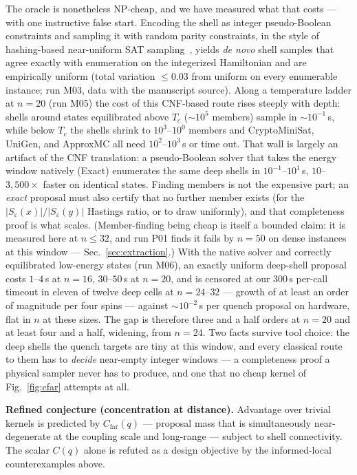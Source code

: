 \documentclass[aps,prx,reprint,floatfix,amsmath,amssymb,amsfonts]{revtex4-2}
\begin{document}
The oracle is nonetheless NP-cheap, and we have measured what that
costs --- with one instructive false start. Encoding the shell as
integer pseudo-Boolean constraints and sampling it with random parity
constraints, in the style of hashing-based near-uniform SAT
sampling~\cite{Gomes2006XOR,Ermon2012UAI,Chakraborty2014UniGen}, yields
\emph{de novo} shell samples that agree exactly with enumeration on the
integerized Hamiltonian and are empirically uniform (total variation
$\le 0.03$ from uniform on every enumerable instance; run M03, data
with the manuscript source). Along a temperature ladder at $n=20$ (run
M05) the cost of this CNF-based route rises steeply with depth: shells
around states equilibrated above $T_c$ ($\sim\!10^{5}$ members) sample
in $\sim 10^{-1}$\,s, while below $T_c$ the shells shrink to
$10^{3}$--$10^{0}$ members and CryptoMiniSat, UniGen, and ApproxMC all
need $10^{2}$--$10^{3}$\,s or time out. That wall is largely an artifact
of the CNF translation: a pseudo-Boolean solver that takes the energy
window natively (Exact) enumerates the same deep shells in
$10^{-1}$--$10^{1}$\,s, $10$--$3{,}500\times$ faster on identical
states. Finding members is not the expensive part; an \emph{exact} proposal
must also certify that no further member exists (for the
$|S_\varepsilon(x)|/|S_\varepsilon(y)|$ Hastings ratio, or to draw
uniformly), and that completeness proof is what scales. (Member-finding
being cheap is itself a bounded claim: it is measured here at
$n\le 32$, and run P01 finds it fails by $n=50$ on dense instances at
this window --- Sec.~\ref{sec:extraction}.) With the native
solver and correctly equilibrated low-energy states (run M06), an
exactly uniform deep-shell proposal costs $1$--$4$\,s at $n=16$,
$30$--$50$\,s at $n=20$, and is censored at our $300$\,s per-call
timeout in eleven of twelve deep cells at $n=24$--$32$ --- growth of at
least an order of magnitude per four spins --- against $\sim 10^{-2}$\,s
per quench proposal on hardware, flat in $n$ at these sizes. The gap is
therefore three and a half orders at $n=20$ and at least four and a
half, widening, from $n=24$. Two facts survive tool choice: the deep
shells the quench targets are tiny at this window, and every classical
route to them has to \emph{decide} near-empty integer windows --- a
completeness proof a physical sampler never has to produce, and one that
no cheap kernel of Fig.~\ref{fig:cfar} attempts at all.

\noindent\textbf{Refined conjecture (concentration at distance).}
Advantage over trivial kernels is predicted by
$C_{\mathrm{far}}(q)$ --- proposal mass that is simultaneously
near-degenerate at the coupling scale and long-range --- subject to
shell connectivity. The scalar $C(q)$ alone is refuted as a design
objective by the informed-local counterexamples above.
\end{document}
